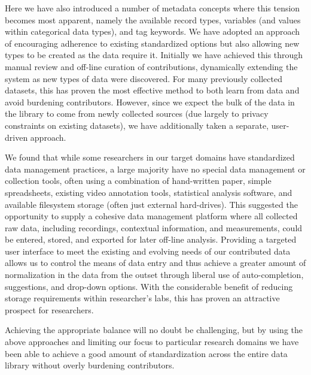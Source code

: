 \documentclass{sig-alternate}
\begin{document}
Here we have also introduced a number of metadata concepts where this tension becomes most apparent, namely the available record types, variables (and values within categorical data types), and tag keywords.
We have adopted an approach of encouraging adherence to existing standardized options but also allowing new types to be created as the data require it.
Initially we have achieved this through manual review and off-line curation of contributions, dynamically extending the system as new types of data were discovered.
For many previously collected datasets, this has proven the most effective method to both learn from data and avoid burdening contributors.
However, since we expect the bulk of the data in the library to come from newly collected sources (due largely to privacy constraints on existing datasets), we have additionally taken a separate, user-driven approach.

We found that while some researchers in our target domains have standardized data management practices, a large majority have no special data management or collection tools, often using a combination of hand-written paper, simple spreadsheets, existing video annotation tools, statistical analysis software, and available filesystem storage (often just external hard-drives).
This suggested the opportunity to supply a cohesive data management platform where all collected raw data, including recordings, contextual information, and measurements, could be entered, stored, and exported for later off-line analysis.
Providing a targeted user interface to meet the existing and evolving needs of our contributed data allows us to control the means of data entry and thus achieve a greater amount of normalization in the data from the outset through liberal use of auto-completion, suggestions, and drop-down options.
With the considerable benefit of reducing storage requirements within researcher's labs, this has proven an attractive prospect for researchers.

Achieving the appropriate balance will no doubt be challenging, but by using the above approaches and limiting our focus to particular research domains we have been able to achieve a good amount of standardization across the entire data library without overly burdening contributors.

\end{document}
